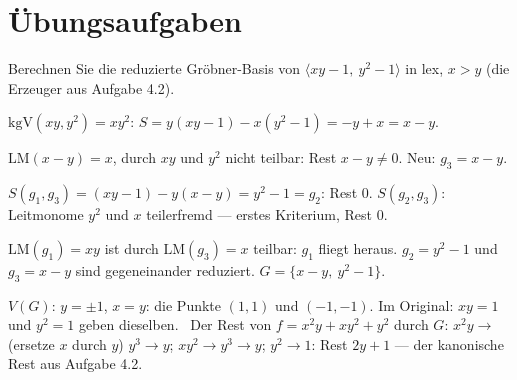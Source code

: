 \section{Übungsaufgaben}

\begin{aufgabe}
Berechnen Sie die reduzierte Gröbner-Basis von $\langle xy - 1,\ y^{2} - 1\rangle$ in lex, $x > y$ (die Erzeuger aus Aufgabe 4.2).

\loesung
{}
$\mathrm{kgV}(xy, y^{2}) = xy^{2}$: $S = y(xy - 1) - x(y^{2} - 1) = -y + x = x - y$.

$\mathrm{LM}(x - y) = x$, durch $xy$ und $y^{2}$ nicht teilbar: Rest $x - y\ne0$. Neu: $g_3 = x - y$.

$S(g_1, g_3) = (xy - 1) - y(x - y) = y^{2} - 1 = g_2$: Rest $0$. $S(g_2, g_3)$: Leitmonome $y^{2}$ und $x$ teilerfremd --- erstes Kriterium, Rest $0$.

$\mathrm{LM}(g_1) = xy$ ist durch $\mathrm{LM}(g_3) = x$ teilbar: $g_1$ fliegt heraus. $g_2 = y^{2} - 1$ und $g_3 = x - y$ sind gegeneinander reduziert. $G = \{x - y,\ y^{2} - 1\}$.

$V(G)$: $y = \pm1$, $x = y$: die Punkte $(1,1)$ und $(-1,-1)$. Im Original: $xy = 1$ und $y^{2} = 1$ geben dieselben. \checkmark\ Der Rest von $f = x^{2}y + xy^{2} + y^{2}$ durch $G$: $x^{2}y\to$ (ersetze $x$ durch $y$) $y^{3}\to y$; $xy^{2}\to y^{3}\to y$; $y^{2}\to1$: Rest $2y + 1$ --- der kanonische Rest aus Aufgabe 4.2. \checkmark
\end{aufgabe}

